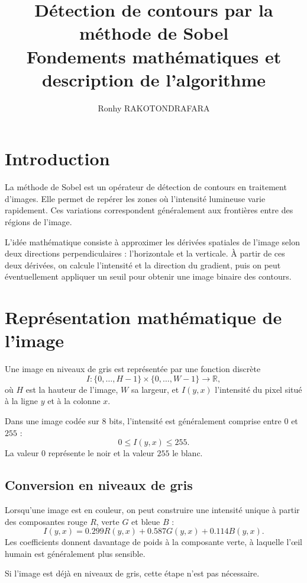 \documentclass[11pt,a4paper]{article}
\title{\textbf{Détection de contours par la méthode de Sobel}\\
       \large Fondements mathématiques et description de l'algorithme}
\author{Ronhy RAKOTONDRAFARA}
\date{}
\begin{document}
\maketitle

\section{Introduction}

La méthode de Sobel est un opérateur de détection de contours en traitement
d'images. Elle permet de repérer les zones où l'intensité lumineuse varie
rapidement. Ces variations correspondent généralement aux frontières entre
des régions de l'image.

L'idée mathématique consiste à approximer les dérivées spatiales de l'image
selon deux directions perpendiculaires : l'horizontale et la verticale.
À partir de ces deux dérivées, on calcule l'intensité et la direction du
gradient, puis on peut éventuellement appliquer un seuil pour obtenir une
image binaire des contours.

\section{Représentation mathématique de l'image}

Une image en niveaux de gris est représentée par une fonction discrète
\[
    I : \{0,\ldots,H-1\}\times\{0,\ldots,W-1\}
    \longrightarrow \mathbb{R},
\]
où $H$ est la hauteur de l'image, $W$ sa largeur, et $I(y,x)$ l'intensité
du pixel situé à la ligne $y$ et à la colonne $x$.

Dans une image codée sur 8 bits, l'intensité est généralement comprise entre
$0$ et $255$ :
\[
    0 \leq I(y,x) \leq 255.
\]
La valeur $0$ représente le noir et la valeur $255$ le blanc.

\subsection{Conversion en niveaux de gris}

Lorsqu'une image est en couleur, on peut construire une intensité unique à
partir des composantes rouge $R$, verte $G$ et bleue $B$ :
\[
    I(y,x)=0.299R(y,x)+0.587G(y,x)+0.114B(y,x).
\]
Les coefficients donnent davantage de poids à la composante verte, à laquelle
l'œil humain est généralement plus sensible.

Si l'image est déjà en niveaux de gris, cette étape n'est pas nécessaire.
\end{document}
